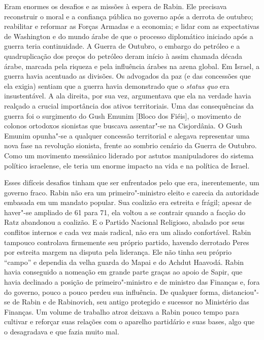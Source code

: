 Eram enormes os desafios e as missões à espera de Rabin. Ele precisava
reconstruir o moral e a confiança pública no governo após a derrota de
outubro; reabilitar e reformar as Forças Armadas e a economia; e lidar
com as expectativas de Washington e do mundo árabe de que o processo
diplomático iniciado após a guerra teria continuidade. A Guerra de
Outubro, o embargo do petróleo e a quadruplicação dos preços do petróleo
deram início à assim chamada década árabe, marcada pela riqueza e pela
influência árabes na arena global. Em Israel, a guerra havia acentuado
as divisões. Os advogados da paz (e das concessões que ela exigia)
sentiam que a guerra havia demonstrado que o \emph{status quo} era
insustentável. A ala direita, por sua vez, argumentava que ela na
verdade havia realçado a crucial importância dos ativos territoriais.
Uma das consequências da guerra foi o surgimento do Gush Emunim {[}Bloco
dos Fiéis{]}, o movimento de colonos ortodoxos sionistas que buscava
assentar"-se na Cisjordânia. O Gush Emunim opunha"-se a qualquer concessão
territorial e alegava representar uma nova fase na revolução sionista,
frente ao sombrio cenário da Guerra de Outubro. Como um movimento
messiânico liderado por astutos manipuladores do sistema político
israelense, ele teria um enorme impacto na vida e na política de Israel.

Esses difíceis desafios tinham que ser enfrentados pelo que era,
inerentemente, um governo fraco. Rabin não era um primeiro"-ministro
eleito e carecia da autoridade embasada em um mandato popular. Sua
coalizão era estreita e frágil; apesar de haver"-se ampliado de 61 para
71, ela voltou a se contrair quando a facção do Ratz abandonou a
coalizão. E o Partido Nacional Religioso, abalado por seus conflitos
internos e cada vez mais radical, não era um aliado confortável. Rabin
tampouco controlava firmemente seu próprio partido, havendo derrotado
Peres por estreita margem na disputa pela liderança. Ele não tinha seu
próprio ``campo'' e dependia da velha guarda do Mapai e do
Achdut Haavodá. Rabin havia conseguido a nomeação em grande parte graças
ao apoio de Sapir, que havia declinado a posição de primeiro"-ministro e
de ministro das Finanças e, fora do governo, pouco a pouco perdeu sua
influência. De qualquer forma, distanciou"-se de Rabin e de
Rabinovich, seu antigo protegido e sucessor no Ministério das Finanças.
Um volume de trabalho atroz deixava a Rabin pouco tempo para cultivar e
reforçar suas relações com o aparelho partidário e suas bases, algo que
o desagradava e que fazia muito mal.

